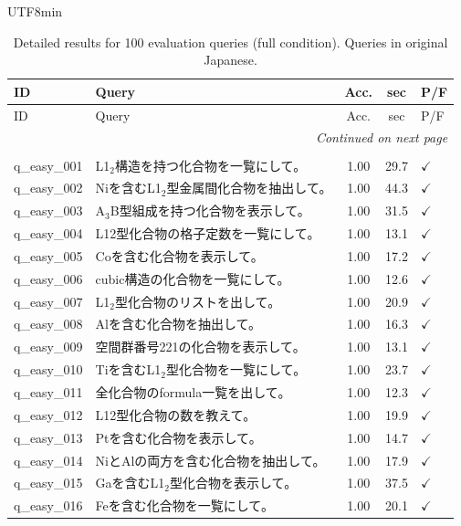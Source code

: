 \documentclass[sn-mathphys,Numbered]{sn-jnl}
\begin{document}
\begin{CJK}{UTF8}{min}
\begin{longtable}{lp{8.5cm}ccl}
  \caption{Detailed results for 100 evaluation queries (full condition). Queries in original Japanese.}
  \label{tab:sup_query_detail} \\
  \toprule
  ID & Query & Acc. & sec & P/F \\
  \midrule
  \endfirsthead
  \toprule
  ID & Query & Acc. & sec & P/F \\
  \midrule
  \endhead
  \midrule
  \multicolumn{5}{r}{\textit{Continued on next page}} \\
  \endfoot
  \bottomrule
  \endlastfoot
    \midrule
    \multicolumn{5}{l}{\textbf{Easy ($n$=20)}} \\
    \midrule
    q\_easy\_001 & L1$_2$構造を持つ化合物を一覧にして。 & 1.00 & 29.7 & $\checkmark$ \\
    q\_easy\_002 & Niを含むL1$_2$型金属間化合物を抽出して。 & 1.00 & 44.3 & $\checkmark$ \\
    q\_easy\_003 & A$_3$B型組成を持つ化合物を表示して。 & 1.00 & 31.5 & $\checkmark$ \\
    q\_easy\_004 & L12型化合物の格子定数を一覧にして。 & 1.00 & 13.1 & $\checkmark$ \\
    q\_easy\_005 & Coを含む化合物を表示して。 & 1.00 & 17.2 & $\checkmark$ \\
    q\_easy\_006 & cubic構造の化合物を一覧にして。 & 1.00 & 12.6 & $\checkmark$ \\
    q\_easy\_007 & L1$_2$型化合物のリストを出して。 & 1.00 & 20.9 & $\checkmark$ \\
    q\_easy\_008 & Alを含む化合物を抽出して。 & 1.00 & 16.3 & $\checkmark$ \\
    q\_easy\_009 & 空間群番号221の化合物を表示して。 & 1.00 & 13.1 & $\checkmark$ \\
    q\_easy\_010 & Tiを含むL1$_2$型化合物を一覧にして。 & 1.00 & 23.7 & $\checkmark$ \\
    q\_easy\_011 & 全化合物のformula一覧を出して。 & 1.00 & 12.3 & $\checkmark$ \\
    q\_easy\_012 & L12型化合物の数を教えて。 & 1.00 & 19.9 & $\checkmark$ \\
    q\_easy\_013 & Ptを含む化合物を表示して。 & 1.00 & 14.7 & $\checkmark$ \\
    q\_easy\_014 & NiとAlの両方を含む化合物を抽出して。 & 1.00 & 17.9 & $\checkmark$ \\
    q\_easy\_015 & Gaを含むL1$_2$型化合物を表示して。 & 1.00 & 37.5 & $\checkmark$ \\
    q\_easy\_016 & Feを含む化合物を一覧にして。 & 1.00 & 20.1 & $\checkmark$ \\

\end{longtable}
\end{CJK}
\end{document}
